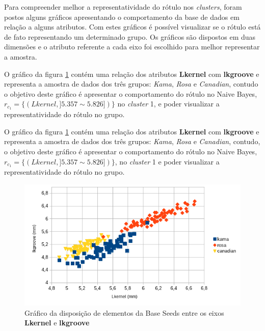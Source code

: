 Para compreender melhor a representatividade do rótulo nos \textit{clusters}, foram postos alguns gráficos apresentando o comportamento da base de dados em relação a alguns atributos. Com estes gráficos é possível visualizar se o rótulo está de fato representando um determinado grupo. Os gráficos são dispostos em duas dimensões e o atributo referente a cada eixo foi escolhido para melhor representar a amostra. 

O gráfico da figura \ref{fig:grafico_NB_cluster1_lkernel_lkgroove_seeds} contém uma relação dos atributos \textbf{Lkernel} com \textbf{lkgroove} e representa a amostra de dados dos três grupos: \textit{Kama}, \textit{Rosa} e \textit{Canadian}, contudo o objetivo deste gráfico é apresentar o comportamento do rótulo  no Naive Bayes, ${r_{c_1}=\{ (Lkernel, ] 5.357 \sim  5.826 ]) \} }$ no \textit{cluster} 1, e poder visualizar a representatividade do rótulo no grupo.

O gráfico da figura  \ref{fig:grafico_NB_cluster1_lkernel_lkgroove_seeds} contém uma relação dos atributos \textbf{Lkernel} com \textbf{lkgroove} e representa a amostra de dados dos três grupos: \textit{Kama}, \textit{Rosa} e \textit{Canadian}, contudo, o objetivo deste gráfico é apresentar o comportamento do rótulo no Naive Bayes,${r_{c_1}=\{ (Lkernel, ] 5.357 \sim  5.826 ]) \} }$, no \textit{cluster} 1 e poder visualizar a representatividade do rótulo no grupo. 

\begin{figure}[h!]
        \centering
        \includegraphics[scale=0.9]{figs/grafico_NB_cluster1_lkernel_lkgroove_seeds.png}
        \caption{Gráfico da disposição de elementos da Base Seeds entre os eixos \textbf{Lkernel} e \textbf{lkgroove}} \label{fig:grafico_NB_cluster1_lkernel_lkgroove_seeds}
\end{figure}


